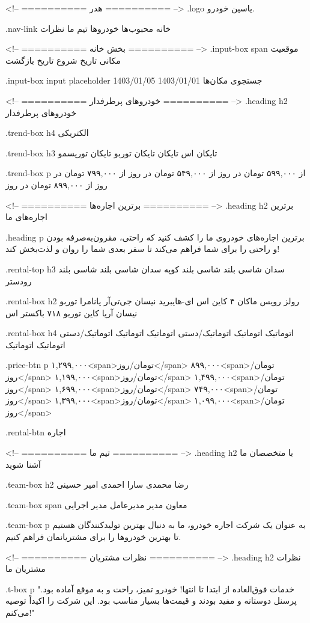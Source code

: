<!-- ========== هدر ========== -->
.logo
یاسین خودرو.

.nav-link
خانه
محبوب‌ها
خودروها
تیم ما
نظرات

<!-- ========== بخش خانه ========== -->
.input-box span
موقعیت مکانی
تاریخ شروع
تاریخ بازگشت

.input-box input placeholder
جستجوی مکان‌ها
1403/01/01
1403/01/05

<!-- ========== خودروهای پرطرفدار ========== -->
.heading h2
خودروهای پرطرفدار

.trend-box h4
الکتریکی

.trend-box h3
تایکان اس
تایکان
تایکان توربو
تایکان توریسمو

.trend-box p
از ۵۹۹,۰۰۰ تومان در روز
از ۵۴۹,۰۰۰ تومان در روز
از ۷۹۹,۰۰۰ تومان در روز
از ۸۹۹,۰۰۰ تومان در روز

<!-- ========== برترین اجاره‌ها ========== -->
.heading h2
برترین اجاره‌های ما

.heading p
برترین اجاره‌های خودروی ما را کشف کنید که راحتی، مقرون‌به‌صرفه بودن و راحتی را برای شما فراهم می‌کند تا سفر بعدی شما را روان و لذت‌بخش کند!

.rental-top h3
سدان
شاسی بلند
شاسی بلند
کوپه
سدان
شاسی بلند
شاسی بلند
رودستر

.rental-box h2
رولز رویس
ماکان ۴
کاین اس ای-هایبرید
نیسان جی‌تی‌آر
پانامرا توربو
نیسان آریا
کاین توربو
۷۱۸ باکستر اس

.rental-box h4
اتوماتیک
اتوماتیک
اتوماتیک/دستی
اتوماتیک
اتوماتیک
اتوماتیک/دستی
اتوماتیک
اتوماتیک

.price-btn p
۱,۲۹۹,۰۰۰<span>تومان/روز</span>
۸۹۹,۰۰۰<span>تومان/روز</span>
۱,۱۹۹,۰۰۰<span>تومان/روز</span>
۱,۴۹۹,۰۰۰<span>تومان/روز</span>
۱,۶۹۹,۰۰۰<span>تومان/روز</span>
۷۴۹,۰۰۰<span>تومان/روز</span>
۱,۳۹۹,۰۰۰<span>تومان/روز</span>
۱,۰۹۹,۰۰۰<span>تومان/روز</span>

.rental-btn
اجاره

<!-- ========== تیم ما ========== -->
.heading h2
با متخصصان ما آشنا شوید

.team-box h2
رضا محمدی
سارا احمدی
امیر حسینی

.team-box span
معاون مدیر
مدیرعامل
مدیر اجرایی

.team-box p
به عنوان یک شرکت اجاره خودرو، ما به دنبال بهترین تولیدکنندگان هستیم تا بهترین خودروها را برای مشتریانمان فراهم کنیم.

<!-- ========== نظرات مشتریان ========== -->
.heading h2
نظرات مشتریان ما

.t-box p
"خدمات فوق‌العاده از ابتدا تا انتها! خودرو تمیز، راحت و به موقع آماده بود. پرسنل دوستانه و مفید بودند و قیمت‌ها بسیار مناسب بود. این شرکت را اکیداً توصیه می‌کنم!"

